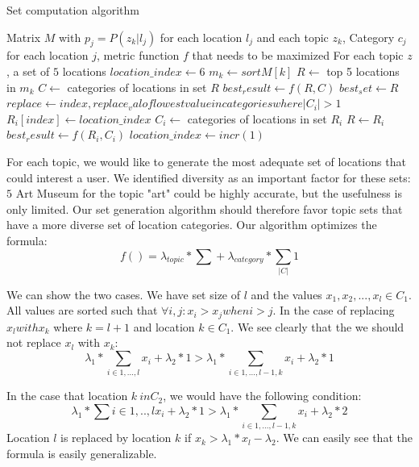 \begin{algorithm}
\caption{Set computation algorithm}
\label{alg:set}
\begin{algorithmic}
  \REQUIRE Matrix $M$ with $p_j = P(z_k|l_j)$ for each location $l_j$ and each topic $z_k$, Category $c_j$ for each location $j$, metric function $f$ that needs to be maximized
  \ENSURE For each topic $z$, a set of $5$ locations
  \STATE $location\_index \leftarrow 6$
  \STATE $m_k \leftarrow sort M[k]$
  \STATE $R \leftarrow $ top 5 locations in $m_k$
  \STATE $C \leftarrow $ categories of locations in set $R$
  \STATE $best_result \leftarrow f(R, C)$
  \STATE $best_set \leftarrow R$
    \STATE $replace \leftarrow index, replace_val of lowest value in categories where |C_i| > 1$
      \STATE $R_i[index] \leftarrow location\_index$
      \STATE $C_i \leftarrow$ categories of locations in set $R_i$
        \STATE $R \leftarrow R_i$
        \STATE $best_result \leftarrow f(R_i, C_i)$
      \ENDIF
    \ENDFOR
    \STATE $location\_index \leftarrow incr(1)$
  \ENDWHILE
  \ENDFOR
\end{algorithmic}

\end{algorithm}

For each topic, we would like to generate the most adequate set of locations that could interest a user. We identified diversity as an important factor for these sets: $5$ Art Museum for the topic "art" could be highly accurate, but the usefulness is only limited. Our set generation algorithm should therefore favor topic sets that have a more diverse set of location categories. Our algorithm optimizes the formula:
\[
  f() = \lambda_{topic} * \sum{} + \lambda_{category} * \sum_{|C|} {1}
\]

We can show the two cases. We have set size of $l$ and the values $x_1, x_2, ..., x_l \in C_1$. All values are sorted such that $\forall i, j: x_i > x_j when i > j$. In the case of replacing $x_l with x_k$ where $k = l + 1$ and location $k \in C_1$. We see clearly that the we should not replace $x_l$ with $x_k$:
\[
  \lambda_1 * \sum_{i \in 1,...,l} {x_i} + \lambda_2 * 1 > \lambda_1 * \sum_{i \in 1,...,l-1,k} {x_i} + \lambda_2 * 1
\]

In the case that location $k \ in C_2$, we would have the following condition:
\[
  \lambda_1 * \sum{i \in 1,..,l}{x_i} + \lambda_2 * 1 > \lambda_1 * \sum_{i \in 1,...,l-1,k}{x_i} + \lambda_2 * 2
\]
Location $l$ is replaced by location $k$ if $x_k > \lambda_1 * x_l - \lambda_2$. We can easily see that the formula is easily generalizable.

